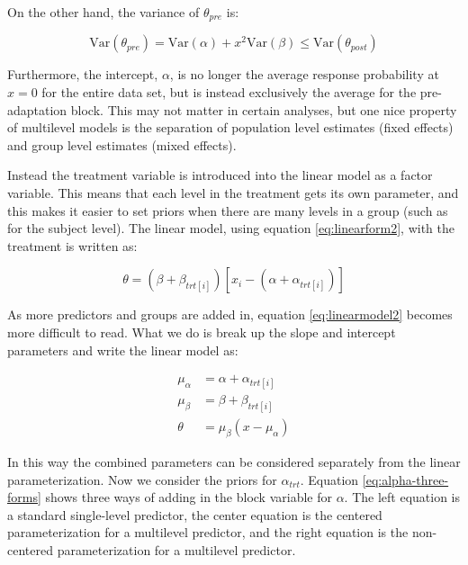 \documentclass[11pt, oneside, openany]{scrbook}
\begin{document}
On the other hand, the variance of \(\theta_{pre}\) is:


\[
\mathrm{Var}(\theta_{pre}) = \mathrm{Var}(\alpha) + x^2 \mathrm{Var}(\beta) \le \mathrm{Var}(\theta_{post})
\]

Furthermore, the intercept, \(\alpha\), is no longer the average response probability at \(x=0\) for the entire data set, but is instead exclusively the average for the pre-adaptation block. This may not matter in certain analyses, but one nice property of multilevel models is the separation of population level estimates (fixed effects) and group level estimates (mixed effects).

Instead the treatment variable is introduced into the linear model as a factor variable. This means that each level in the treatment gets its own parameter, and this makes it easier to set priors when there are many levels in a group (such as for the subject level). The linear model, using equation \eqref{eq:linearform2}, with the treatment is written as:


\begin{equation}
  \theta = (\beta + \beta_{trt[i]}) \left[x_i - (\alpha + \alpha_{trt[i]})\right]
  \label{eq:linearmodel2}
\end{equation}

As more predictors and groups are added in, equation \eqref{eq:linearmodel2} becomes more difficult to read. What we do is break up the slope and intercept parameters and write the linear model as:


\begin{align*}
\mu_\alpha &= \alpha + \alpha_{trt[i]} \\
\mu_\beta &= \beta + \beta_{trt[i]} \\
\theta &= \mu_\beta (x - \mu_\alpha)
\end{align*}

In this way the combined parameters can be considered separately from the linear parameterization. Now we consider the priors for \(\alpha_{trt}\). Equation \eqref{eq:alpha-three-forms} shows three ways of adding in the block variable for \(\alpha\). The left equation is a standard single-level predictor, the center equation is the centered parameterization for a multilevel predictor, and the right equation is the non-centered parameterization for a multilevel predictor.
\end{document}
